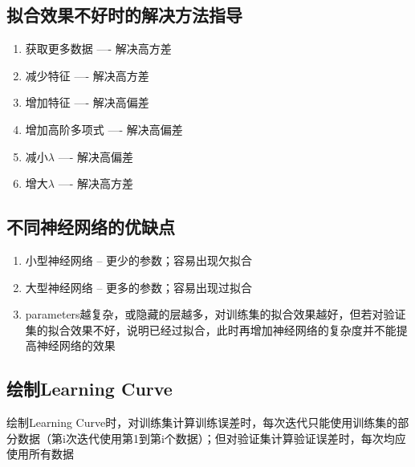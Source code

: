 \subsection{拟合效果不好时的解决方法指导}
\begin{enumerate}
	\item 获取更多数据 ---- 解决高方差
	\item 减少特征 ---- 解决高方差
	\item 增加特征 ---- 解决高偏差
	\item 增加高阶多项式 ---- 解决高偏差
	\item 减小$\lambda$ ---- 解决高偏差
	\item 增大$\lambda$ ---- 解决高方差
\end{enumerate}

\subsection{不同神经网络的优缺点}
\begin{enumerate}
	\item 小型神经网络 -- 更少的参数；容易出现欠拟合
	\item 大型神经网络 -- 更多的参数；容易出现过拟合
	\item parameters越复杂，或隐藏的层越多，对训练集的拟合效果越好，但若对验证集的拟合效果不好，说明已经过拟合，此时再增加神经网络的复杂度并不能提高神经网络的效果
\end{enumerate}

\subsection{绘制Learning Curve}
绘制Learning Curve时，对训练集计算训练误差时，每次迭代只能使用训练集的部分数据（第i次迭代使用第1到第i个数据）；但对验证集计算验证误差时，每次均应使用所有数据








